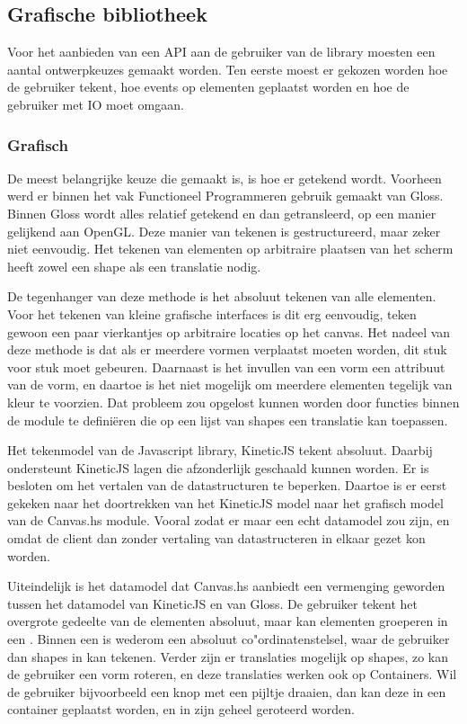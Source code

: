 \subsection{Grafische bibliotheek} \label{subsec:grafische_bibliotheek}

Voor het aanbieden van een API aan de gebruiker van de library moesten een aantal ontwerpkeuzes gemaakt worden. Ten eerste moest er gekozen worden hoe de gebruiker tekent, hoe events op elementen geplaatst worden en hoe de gebruiker met IO moet omgaan.

\subsubsection{Grafisch}
De meest belangrijke keuze die gemaakt is, is hoe er getekend wordt. Voorheen werd er binnen het vak Functioneel Programmeren gebruik gemaakt van Gloss. Binnen Gloss wordt alles relatief getekend en dan getransleerd, op een manier gelijkend aan OpenGL. Deze manier van tekenen is gestructureerd, maar zeker niet eenvoudig. Het tekenen van elementen op arbitraire plaatsen van het scherm heeft zowel een shape als een translatie nodig.

De tegenhanger van deze methode is het absoluut tekenen van alle elementen. Voor het tekenen van kleine grafische interfaces is dit erg eenvoudig, teken gewoon een paar vierkantjes op arbitraire locaties op het canvas. Het nadeel van deze methode is dat als er meerdere vormen verplaatst moeten worden, dit stuk voor stuk moet gebeuren. Daarnaast is het invullen van een vorm een attribuut van de vorm, en daartoe is het niet mogelijk om meerdere elementen tegelijk van kleur te voorzien. Dat probleem zou opgelost kunnen worden door functies binnen de module te defini\"eren die op een lijst van shapes een translatie kan toepassen.

Het tekenmodel van de Javascript library, KineticJS tekent absoluut. Daarbij ondersteunt KineticJS lagen die afzonderlijk geschaald kunnen worden. Er is besloten om het vertalen van de datastructuren te beperken. Daartoe is er eerst gekeken naar het doortrekken van het KineticJS model naar het grafisch model van de Canvas.hs module. Vooral zodat er maar een echt datamodel zou zijn, en omdat de client dan zonder vertaling van datastructeren in elkaar gezet kon worden.

Uiteindelijk is het datamodel dat Canvas.hs aanbiedt een vermenging geworden tussen het datamodel van KineticJS en van Gloss. De gebruiker tekent het overgrote gedeelte van de elementen absoluut, maar kan elementen groeperen in een . Binnen een  is wederom een absoluut co"ordinatenstelsel, waar de gebruiker dan shapes in kan tekenen. Verder zijn er translaties mogelijk op shapes, zo kan de gebruiker een vorm roteren, en deze translaties werken ook op Containers. Wil de gebruiker bijvoorbeeld een knop met een pijltje draaien, dan kan deze in een container geplaatst worden, en in zijn geheel geroteerd worden.

